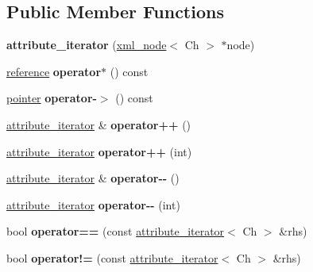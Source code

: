 \subsection*{Public Member Functions}
\begin{DoxyCompactItemize}
\item 
\mbox{\label{classrapidxml_1_1attribute__iterator_a1109344dead88533ae4dd68cea5d9613}} 
{\bfseries attribute\+\_\+iterator} (\hyperlink{classrapidxml_1_1xml__node}{xml\+\_\+node}$<$ Ch $>$ $\ast$node)
\item 
\mbox{\label{classrapidxml_1_1attribute__iterator_aa15f5f06d2a6199467a33aa19f4357aa}} 
\hyperlink{classrapidxml_1_1xml__attribute}{reference} {\bfseries operator$\ast$} () const
\item 
\mbox{\label{classrapidxml_1_1attribute__iterator_a499c7ed0e1835f029585d0a9ba25f446}} 
\hyperlink{classrapidxml_1_1xml__attribute}{pointer} {\bfseries operator-\/$>$} () const
\item 
\mbox{\label{classrapidxml_1_1attribute__iterator_afe7d15a4a1b228f97f1d4ebd4f3f6cca}} 
\hyperlink{classrapidxml_1_1attribute__iterator}{attribute\+\_\+iterator} \& {\bfseries operator++} ()
\item 
\mbox{\label{classrapidxml_1_1attribute__iterator_a82c8859b9eebd45caa3afc25b9e78c36}} 
\hyperlink{classrapidxml_1_1attribute__iterator}{attribute\+\_\+iterator} {\bfseries operator++} (int)
\item 
\mbox{\label{classrapidxml_1_1attribute__iterator_af22f1ad3c11d3269b43b49e29b89d7d1}} 
\hyperlink{classrapidxml_1_1attribute__iterator}{attribute\+\_\+iterator} \& {\bfseries operator-\/-\/} ()
\item 
\mbox{\label{classrapidxml_1_1attribute__iterator_af52a8562ab1b2c0391cdde79f55e4a6f}} 
\hyperlink{classrapidxml_1_1attribute__iterator}{attribute\+\_\+iterator} {\bfseries operator-\/-\/} (int)
\item 
\mbox{\label{classrapidxml_1_1attribute__iterator_ab1dc8dd11d21e145a4e3f76d46aead0d}} 
bool {\bfseries operator==} (const \hyperlink{classrapidxml_1_1attribute__iterator}{attribute\+\_\+iterator}$<$ Ch $>$ \&rhs)
\item 
\mbox{\label{classrapidxml_1_1attribute__iterator_a39e8cf336c324521fd9c720abf280d88}} 
bool {\bfseries operator!=} (const \hyperlink{classrapidxml_1_1attribute__iterator}{attribute\+\_\+iterator}$<$ Ch $>$ \&rhs)
\end{DoxyCompactItemize}


